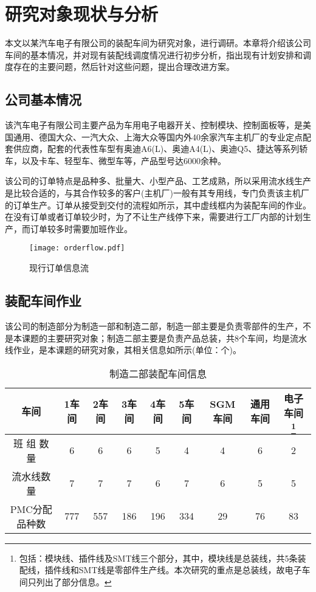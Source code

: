 \chapter{研究对象现状与分析}
本文以某汽车电子有限公司的装配车间为研究对象，进行调研。本章将介绍该公司车间的基本情况，并对现有装配线调度情况进行初步分析，指出现有计划安排和调度存在的主要问题，然后针对这些问题，提出合理改进方案。

\section{公司基本情况}
该汽车电子有限公司主要产品为车用电子电器开关、控制模块、控制面板等，是美国通用、德国大众、一汽大众、上海大众等国内外40余家汽车主机厂的专业定点配套供应商，配套的代表性车型有奥迪A6(L)、奥迪A4(L)、奥迪Q5、捷达等系列轿车，以及卡车、轻型车、微型车等，产品型号达6000余种。

该公司的订单特点是品种多、批量大、小型产品、工艺成熟，所以采用流水线生产是比较合适的，与其合作较多的客户(主机厂)一般有其专用线，专门负责该主机厂的订单生产。订单从接受到交付的流程如所示，其中虚线框内为装配车间的作业。在没有订单或者订单较少时，为了不让生产线停下来，需要进行工厂内部的计划生产，而订单较多时需要加班作业。
\begin{figure}[h]
\centering
\texttt{[image: orderflow.pdf]}
\caption{现行订单信息流\label{fig:orderflow}}
\end{figure}
\section{装配车间作业}
该公司的制造部分为制造一部和制造二部，制造一部主要是负责零部件的生产，不是本课题的主要研究对象；制造二部主要是负责产品总装，共8个车间，均是流水线作业，是本课题的研究对象，其相关信息如所示(单位：个)。
\begin{table}[htbp]
  \centering
  \caption{制造二部装配车间信息}
    \begin{tabular}{cccccccccc}
    \toprule
    \multicolumn{2}{c}{车间 } & 1车间   & 2车间   & 3车间   & 4车间   & 5车间   & SGM车间 & 通用车间  & 电子车间 \footnote{包括：模块线、插件线及SMT线三个部分，其中，模块线是总装线，共5条装配线，插件线和SMT线是零部件生产线。本次研究的重点是总装线，故电子车间只列出了部分信息。} \\
    \midrule
    \multicolumn{2}{c}{班 组 数 量} & 6     & 6     & 6     & 5     & 4     & 4     & 6     & 2 \\
    \multicolumn{2}{c}{流水线数量} & 7     & 7     & 7     & 6     & 7     & 6     & 5     & 5 \\
    \multicolumn{2}{c}{PMC分配品种数} & 777   & 557   & 186   & 196   & 334   & 29    & 76    & 83 \\
    \bottomrule
    \end{tabular}
  \label{tab:2jobshopinfo}
\end{table}

